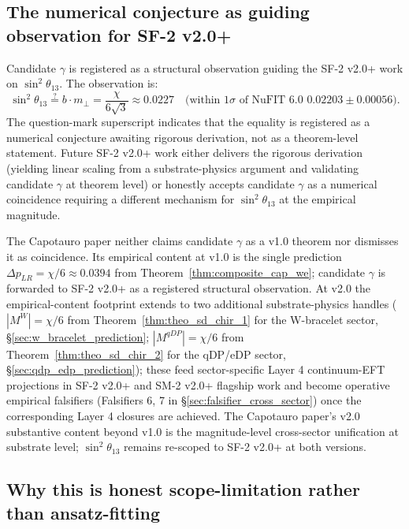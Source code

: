 \documentclass[11pt,letterpaper]{article}
\newcommand{\DeltapLR}{\Delta p_{LR}}
\begin{document}
\subsection{The numerical conjecture as guiding observation for SF-2 v2.0+}\label{sec:gamma_guiding}

Candidate $\gamma$ is registered as a structural observation guiding the SF-2 v2.0+ work on $\sin^2\theta_{13}$. The observation is:
\begin{equation}\label{eq:gamma_registered}
\sin^2\theta_{13} \stackrel{?}{=} b \cdot m_\perp = \frac{\chi}{6\sqrt{3}} \approx 0.0227 \quad \text{(within $1\sigma$ of NuFIT 6.0 } 0.02203 \pm 0.00056\text{)}.
\end{equation}
The question-mark superscript indicates that the equality is registered as a numerical conjecture awaiting rigorous derivation, not as a theorem-level statement. Future SF-2 v2.0+ work either delivers the rigorous derivation (yielding linear scaling from a substrate-physics argument and validating candidate $\gamma$ at theorem level) or honestly accepts candidate $\gamma$ as a numerical coincidence requiring a different mechanism for $\sin^2\theta_{13}$ at the empirical magnitude.

The Capotauro paper neither claims candidate $\gamma$ as a v1.0 theorem nor dismisses it as coincidence. Its empirical content at v1.0 is the single prediction $\DeltapLR = \chi/6 \approx 0.0394$ from Theorem~\ref{thm:composite_cap_we}; candidate $\gamma$ is forwarded to SF-2 v2.0+ as a registered structural observation. At v2.0 the empirical-content footprint extends to two additional substrate-physics handles ($|M^W| = \chi/6$ from Theorem~\ref{thm:theo_sd_chir_1} for the W-bracelet sector, \S\ref{sec:w_bracelet_prediction}; $|M^{qDP}| = \chi/6$ from Theorem~\ref{thm:theo_sd_chir_2} for the qDP/eDP sector, \S\ref{sec:qdp_edp_prediction}); these feed sector-specific Layer 4 continuum-EFT projections in SF-2 v2.0+ and SM-2 v2.0+ flagship work and become operative empirical falsifiers (Falsifiers 6, 7 in \S\ref{sec:falsifier_cross_sector}) once the corresponding Layer 4 closures are achieved. The Capotauro paper's v2.0 substantive content beyond v1.0 is the magnitude-level cross-sector unification at substrate level; $\sin^2\theta_{13}$ remains re-scoped to SF-2 v2.0+ at both versions.

\subsection{Why this is honest scope-limitation rather than ansatz-fitting}\label{sec:scope_limitation_honesty}
\end{document}
